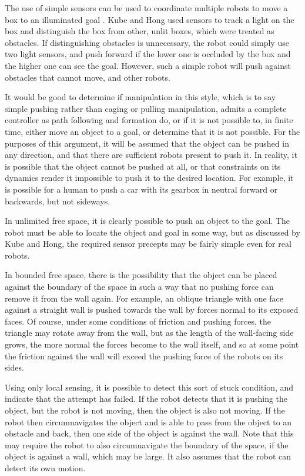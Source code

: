 The use of simple sensors can be used to coordinate multiple robots to move a box to an illuminated goal \citep{kube1996use}. 
Kube and Hong used sensors to track a light on the box and distinguish the box from other, unlit boxes, which were treated as obstacles. 
If distinguishing obstacles is unnecessary, the robot could simply use two light sensors, and push forward if the lower one is occluded by the box and the higher one can see the goal. 
However, such a simple robot will push against obstacles that cannot move, and other robots. 

It would be good to determine if manipulation in this style, which is to say simple pushing rather than caging or pulling manipulation, admits a complete controller as path following and formation do, or if it is not possible to, in finite time, either move an object to a goal, or determine that it is not possible. 
For the purposes of this argument, it will be assumed that the object can be pushed in any direction, and that there are sufficient robots present to push it. 
In reality, it is possible that the object cannot be pushed at all, or that constraints on its dynamics render it impossible to push it to the desired location. 
For example, it is possible for a human to push a car with its gearbox in neutral forward or backwards, but not sideways. 

In unlimited free space, it is clearly possible to push an object to the goal.
The robot must be able to locate the object and goal in some way, but as discussed by Kube and Hong, the required sensor precepts may be fairly simple even for real robots. 

In bounded free space, there is the possibility that the object can be placed against the boundary of the space in such a way that no pushing force can remove it from the wall again. 
For example, an oblique triangle with one face against a straight wall is pushed towards the wall by forces normal to its exposed faces. 
Of course, under some conditions of friction and pushing forces, the triangle may rotate away from the wall, but as the length of the wall-facing side grows, the more normal the forces become to the wall itself, and so at some point the friction against the wall will exceed the pushing force of the robots on its sides. 

Using only local sensing, it is possible to detect this sort of stuck condition, and indicate that the attempt has failed. 
If the robot detects that it is pushing the object, but the robot is not moving, then the object is also not moving. 
If the robot then circumnavigates the object and is able to pass from the object to an obstacle and back, then one side of the object is against the wall. 
Note that this may require the robot to also circumnavigate the boundary of the space, if the object is against a wall, which may be large. 
It also assumes that the robot can detect its own motion. 

